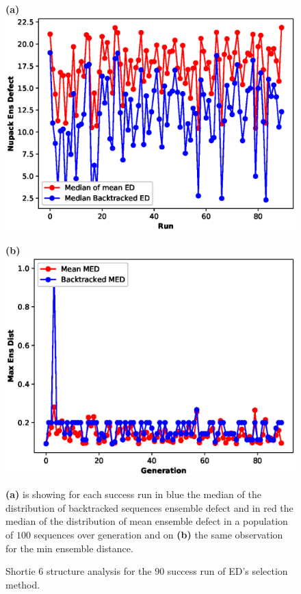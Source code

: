 \documentclass[english,12pt,a4paper]{article}
\theoremstyle{definition}
\begin{document}
\begin{figure}[H] 
	\vspace{-0.1cm}
	\hspace{-1.2cm}
	\begin{minipage}{0.60\textwidth}
		\centering
		\textbf{(a)}\label{Fig:small1}
		\includegraphics[width=.9\linewidth]{images/41-2/1/stat1-48}
	\end{minipage}\hfill
	\begin{minipage}{0.6\textwidth}
		\centering
		
		\textbf{(b)}\label{Fig:small2}
		\includegraphics[width=.9\linewidth]{images/41-2/1/stat4-48}
	\end{minipage}
	
	\caption{Shortie 6 structure analysis for the $90$ success run of  ED's selection method.}\label{Fig:SUM}
	\medskip
	\small
	\textbf{(a)} is showing for each success run in blue the median of the distribution of backtracked sequences ensemble defect and in red the median of the distribution of mean ensemble defect in a population of $100$  sequences over generation and on  \textbf{(b)} the same observation for the min ensemble distance. 
	
	
\end{figure}
\end{document}
